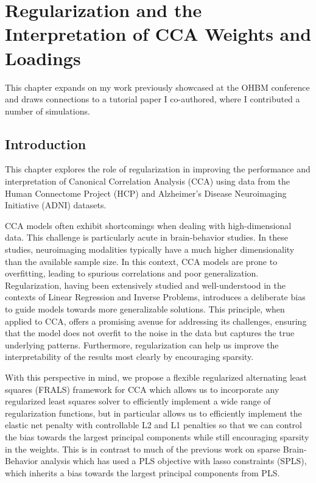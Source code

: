 \graphicspath{{chapters/regularization}}
\chapter{Regularization and the Interpretation of CCA Weights and Loadings}\label{chap:als}
\minitoc
This chapter expands on my work previously showcased at the OHBM conference and draws connections to a tutorial paper I co-authored, where I contributed a number of simulations\citep{mihalik2022canonical}.

\section{Introduction}\label{sec:introduction}

This chapter explores the role of regularization in improving the performance and interpretation of Canonical
Correlation Analysis (CCA) using data from the Human Connectome Project (HCP) and Alzheimer's Disease Neuroimaging Initiative (ADNI) datasets.

CCA models often exhibit shortcomings when dealing with high-dimensional data.
This challenge is particularly acute in brain-behavior studies.
In these studies, neuroimaging modalities typically have a much higher dimensionality than the available sample size.
In this context, CCA models are prone to overfitting, leading to spurious correlations and poor generalization.
Regularization, having been extensively studied and well-understood in the contexts of Linear Regression and Inverse Problems, introduces a deliberate bias to guide models towards more generalizable solutions.
This principle, when applied to CCA, offers a promising avenue for addressing its challenges, ensuring that the model does not overfit to the noise in the data but captures the true underlying patterns.
Furthermore, regularization can help us improve the interpretability of the results most clearly by encouraging sparsity.

With this perspective in mind, we propose a flexible regularized alternating least squares (FRALS) framework for CCA which allows us to incorporate any regularized least squares solver to efficiently implement a wide range of regularization functions, but in particular allows us to efficiently implement the elastic net penalty with controllable L2 and L1 penalties so that we can control the bias towards the largest principal components while still encouraging sparsity in the weights.
This is in contrast to much of the previous work on sparse Brain-Behavior analysis which has used a PLS objective with lasso constraints (SPLS), which inherits a bias towards the largest principal components from PLS.


